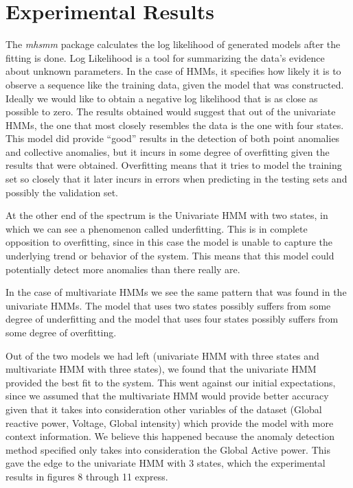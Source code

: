 \documentclass[letterpaper, 11pt]{article}%
\begin{document}
\section{Experimental Results}
The \textit{mhsmm} package calculates the log likelihood of generated models after the fitting is done. Log Likelihood is a tool for summarizing the data's evidence about unknown parameters\cite{log}. In the case of HMMs, it specifies how likely it is to observe a sequence like the training data, given the model that was constructed. Ideally we would like to obtain a negative log likelihood that is as close as possible to zero. The results obtained would suggest that out of the univariate HMMs, the one that most closely resembles the data is the one with four states. This model did provide ``good'' results in the detection of both point anomalies and collective anomalies, but it incurs in some degree of overfitting given the results that were obtained. Overfitting means that it tries to model the training set so closely that it later incurs in errors when predicting in the testing sets and possibly the validation set.

At the other end of the spectrum is the Univariate HMM with two states, in which we can see a phenomenon called underfitting. This is in complete opposition to overfitting, since in this case the model is unable to capture the underlying trend or behavior of the system. This means that this model could potentially detect more anomalies than there really are.

In the case of multivariate HMMs we see the same pattern that was found in the univariate HMMs. The model that uses two states possibly suffers from some degree of underfitting and the model that uses four states possibly suffers from some degree of overfitting.

Out of the two models we had left (univariate HMM with three states and multivariate HMM with three states), we found that the univariate HMM provided the best fit to the system. This went against our initial expectations, since we assumed that the multivariate HMM would provide better accuracy given that it takes into consideration other variables of the dataset (Global reactive power, Voltage, Global intensity) which provide the model with more context information. We believe this happened because the anomaly detection method specified only takes into consideration the Global Active power. This gave the edge to the univariate HMM with 3 states, which the experimental results in figures 8 through 11 express.
\end{document}
